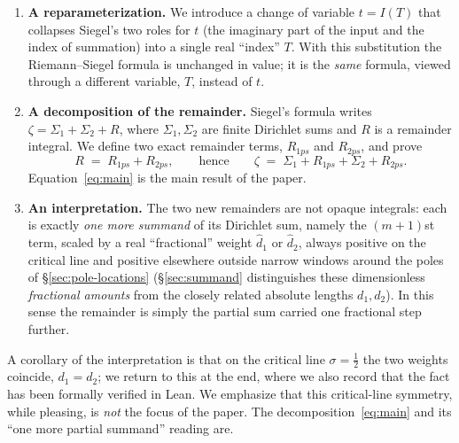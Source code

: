 \documentclass[11pt]{article}
\theoremstyle{definition}
\begin{document}
\begin{enumerate}
\item \textbf{A reparameterization.} We introduce a change of variable
$t=I(T)$ that collapses Siegel's two roles for $t$ (the imaginary part of the
input and the index of summation) into a single real ``index'' $T$. With this
substitution the Riemann--Siegel formula is unchanged in value; it is the
\emph{same} formula, viewed through a different variable, $T$, instead of $t$.

\item \textbf{A decomposition of the remainder.} Siegel's formula writes
$\zeta = \Sigma_1 + \Sigma_2 + R$, where $\Sigma_1,\Sigma_2$ are finite Dirichlet
sums and $R$ is a remainder integral. We define two exact remainder terms,
$R_{1ps}$ and $R_{2ps}$, and prove
\begin{equation}\label{eq:main}
R \;=\; R_{1ps} + R_{2ps},
\qquad\text{hence}\qquad
\zeta \;=\; \Sigma_{1} + R_{1ps} + \Sigma_{2} + R_{2ps}.
\end{equation}
Equation~\eqref{eq:main} is the main result of the paper.

\item \textbf{An interpretation.} The two new remainders are not opaque
integrals: each is exactly \emph{one more summand} of its Dirichlet sum,
namely the $(m+1)$st term, scaled by a real ``fractional'' weight
$\hat d_1$ or $\hat d_2$, always positive on the critical line and positive
elsewhere outside narrow windows around the poles of
\S\ref{sec:pole-locations} (\S\ref{sec:summand} distinguishes these
dimensionless \emph{fractional amounts} from the closely related absolute
lengths $d_1,d_2$). In this sense the remainder is simply the partial sum
carried one fractional step further.
\end{enumerate}

A corollary of the interpretation is that on the critical line $\sigma=\tfrac12$
the two weights coincide, $d_1=d_2$; we return to this at the end, where we also
record that the fact has been formally verified in Lean. We emphasize that this
critical-line symmetry, while pleasing, is \emph{not} the focus of the paper.
The decomposition~\eqref{eq:main} and its ``one more partial summand'' reading
are.
\end{document}
